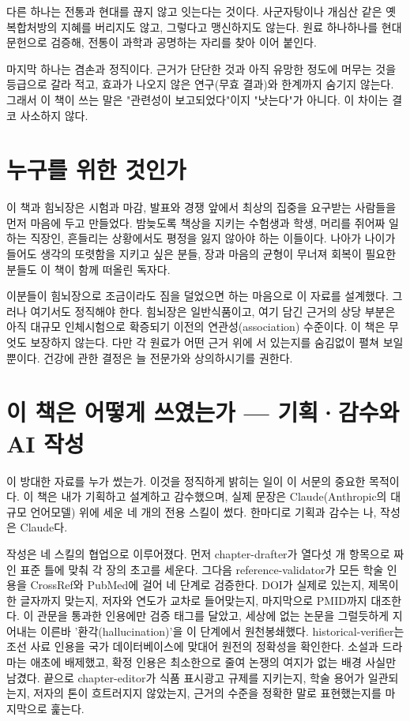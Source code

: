 \documentclass[12pt,oneside]{book}
\begin{document}
다른 하나는 전통과 현대를 끊지 않고 잇는다는 것이다. 사군자탕이나 개심산 같은 옛 복합처방의 지혜를 버리지도 않고, 그렇다고 맹신하지도 않는다. 원료 하나하나를 현대 문헌으로 검증해, 전통이 과학과 공명하는 자리를 찾아 이어 붙인다.

마지막 하나는 겸손과 정직이다. 근거가 단단한 것과 아직 유망한 정도에 머무는 것을 등급으로 갈라 적고, 효과가 나오지 않은 연구(무효 결과)와 한계까지 숨기지 않는다. 그래서 이 책이 쓰는 말은 "관련성이 보고되었다"이지 "낫는다"가 아니다. 이 차이는 결코 사소하지 않다.

\section{누구를 위한 것인가}

이 책과 힘뇌장은 시험과 마감, 발표와 경쟁 앞에서 최상의 집중을 요구받는 사람들을 먼저 마음에 두고 만들었다. 밤늦도록 책상을 지키는 수험생과 학생, 머리를 쥐어짜 일하는 직장인, 흔들리는 상황에서도 평정을 잃지 않아야 하는 이들이다. 나아가 나이가 들어도 생각의 또렷함을 지키고 싶은 분들, 장과 마음의 균형이 무너져 회복이 필요한 분들도 이 책이 함께 떠올린 독자다.

이분들이 힘뇌장으로 조금이라도 짐을 덜었으면 하는 마음으로 이 자료를 설계했다. 그러나 여기서도 정직해야 한다. 힘뇌장은 일반식품이고, 여기 담긴 근거의 상당 부분은 아직 대규모 인체시험으로 확증되기 이전의 연관성(association) 수준이다. 이 책은 무엇도 보장하지 않는다. 다만 각 원료가 어떤 근거 위에 서 있는지를 숨김없이 펼쳐 보일 뿐이다. 건강에 관한 결정은 늘 전문가와 상의하시기를 권한다.

\section{이 책은 어떻게 쓰였는가 — 기획·감수와 AI 작성}

이 방대한 자료를 누가 썼는가. 이것을 정직하게 밝히는 일이 이 서문의 중요한 목적이다. 이 책은 내가 기획하고 설계하고 감수했으며, 실제 문장은 Claude(Anthropic의 대규모 언어모델) 위에 세운 네 개의 전용 스킬이 썼다. 한마디로 기획과 감수는 나, 작성은 Claude다.

작성은 네 스킬의 협업으로 이루어졌다. 먼저 chapter-drafter가 열다섯 개 항목으로 짜인 표준 틀에 맞춰 각 장의 초고를 세운다. 그다음 reference-validator가 모든 학술 인용을 CrossRef와 PubMed에 걸어 네 단계로 검증한다. DOI가 실제로 있는지, 제목이 한 글자까지 맞는지, 저자와 연도가 교차로 들어맞는지, 마지막으로 PMID까지 대조한다. 이 관문을 통과한 인용에만 검증 태그를 달았고, 세상에 없는 논문을 그럴듯하게 지어내는 이른바 '환각(hallucination)'을 이 단계에서 원천봉쇄했다. historical-verifier는 조선 사료 인용을 국가 데이터베이스에 맞대어 원전의 정확성을 확인한다. 소설과 드라마는 애초에 배제했고, 확정 인용은 최소한으로 줄여 논쟁의 여지가 없는 배경 사실만 남겼다. 끝으로 chapter-editor가 식품 표시광고 규제를 지키는지, 학술 용어가 일관되는지, 저자의 톤이 흐트러지지 않았는지, 근거의 수준을 정확한 말로 표현했는지를 마지막으로 훑는다.
\end{document}

